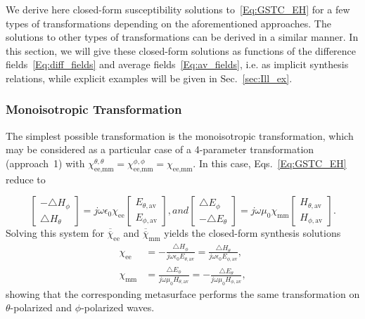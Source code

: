 \documentclass[journal,transaction]{IEEEtran}
\newcommand{\te}[1]{\overline{\overline{#1}}}
\begin{document}
We derive here closed-form susceptibility solutions to~\eqref{Eq:GSTC_EH} for a few types of transformations depending on the aforementioned approaches. The solutions to other types of transformations can be derived in a similar manner. In this section, we will give these closed-form solutions as functions of the difference fields~\eqref{Eq:diff_fields} and average fields~\eqref{Eq:av_fields}, i.e. as implicit synthesis relations, while explicit examples will be given in Sec.~\ref{sec:Ill_ex}.

\subsubsection{Monoisotropic Transformation}

The simplest possible transformation is the monoisotropic transformation, which may be considered as a particular case of a 4-parameter transformation (approach~1) with $\chi_\text{ee,mm}^{\theta,\theta}=\chi_\text{ee,mm}^{\phi,\phi}=\chi_\text{ee,mm}$. In this case, Eqs.~\eqref{Eq:GSTC_EH} reduce to

\begin{subequations}
\begin{equation}\label{Eq:GSTC_isotropic_e}
     \begin{bmatrix}
   -\triangle H_\phi  \\
   \triangle H_\theta
  \end{bmatrix}=j\omega\epsilon_0 \chi_\text{ee}  \begin{bmatrix}
   E_{\theta,\text{av}} \\
   E_{\phi,\text{av}}
  \end{bmatrix},
\end{equation}

and

\begin{equation}\label{Eq:GSTC_isotropic_h}
     \begin{bmatrix}
   \triangle E_\phi  \\
   -\triangle E_\theta
  \end{bmatrix}=j\omega\mu_0 \chi_\text{mm}    \begin{bmatrix}
   H_{\theta,\text{av}}  \\
   H_{\phi,\text{av}}
  \end{bmatrix}.
\end{equation}
\end{subequations}
%
Solving this system for $\te{\chi}_\text{ee}$ and $\te{\chi}_\text{mm}$ yields the closed-form synthesis solutions
%
\begin{subequations}
\begin{align}\label{Eq:GSTC_monoiso_chi}
  \chi_\text{ee} & =-\frac{\triangle H_\phi}{j\omega\epsilon_0 E_{\theta,\text{av}}}=\frac{\triangle H_\theta}{j\omega\epsilon_0 E_{\phi,\text{av}}}, \\
  \chi_\text{mm} & =\frac{\triangle E_\phi}{j\omega\mu_0 H_{\theta,\text{av}}} =-\frac{\triangle E_\theta}{j\omega\mu_0 H_{\phi,\text{av}}},
\end{align}
\end{subequations}
%
showing that the corresponding metasurface performs the same transformation on $\theta$-polarized and $\phi$-polarized waves.
\end{document}
